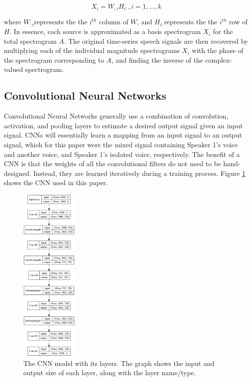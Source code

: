 \documentclass[12pt,chapterheads]{ucsd}
\begin{document}
\begin{equation}
X_i = W_{:i}H_{i:}, i=1,...,k
\end{equation}

\noindent where $W_{:i} $represents the the $i^{th}$ column of $W$, and $H_{i:} $represents the the $i^{th}$ row of $H$. In essence, each source is approximated as a basis spectrogram $X_i$ for the total spectrogram $A$. The original time-series speech signals are then recovered by multiplying each of the individual magnitude spectrograms $X_i$ with the phase of the spectrogram corresponding to $A$, and finding the inverse of the complex-valued spectrogram.

\subsection{Convolutional Neural Networks}
Convolutional Neural Networks generally use a combination of convolution, activation, and pooling layers to estimate a desired output signal given an input signal. CNNs will essentially learn a mapping from an input signal to an output signal, which for this paper were the mixed signal containing Speaker 1's voice and another voice, and Speaker 1's isolated voice, respectively. The benefit of a CNN is that the weights of all the convolutional filters do not need to be hand-designed. Instead, they are learned iteratively during a training process. Figure \ref{fig:cnn_model} shows the CNN used in this paper.

\begin{figure}[h] 
  \centering
  \includegraphics[width=0.25\textwidth]{pics/model}
  \caption[The CNN model and its layers]
{The CNN model with its layers. The graph shows the input and output size of each layer, along with the layer name/type.}
  \label{fig:cnn_model}
\end{figure}
\end{document}
